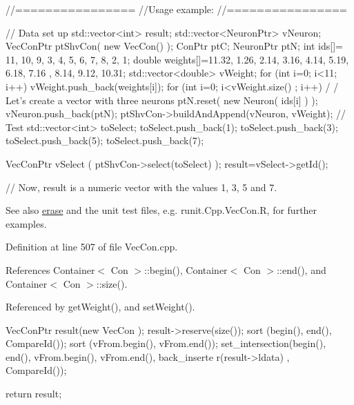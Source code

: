 \begin{DoxyCode}
        //================
        //Usage example:
        //================

        // Data set up
                std::vector<int> result;
                std::vector<NeuronPtr> vNeuron;
                VecConPtr       ptShvCon( new VecCon() );
                ConPtr  ptC;
                NeuronPtr ptN;
                int ids[]= {11, 10, 9, 3, 4, 5, 6, 7, 8, 2, 1};
                double weights[]={11.32, 1.26, 2.14, 3.16, 4.14, 5.19, 6.18, 7.16
      , 8.14, 9.12, 10.31};
                std::vector<double> vWeight;
                for (int i=0; i<11; i++) {
                        vWeight.push_back(weights[i]);
                }
                for (int i=0; i<vWeight.size() ; i++) {                         /
      / Let's create a vector with three neurons
                        ptN.reset( new Neuron( ids[i] ) );
                        vNeuron.push_back(ptN);
                }
                ptShvCon->buildAndAppend(vNeuron, vWeight);
                // Test
                std::vector<int> toSelect;
                toSelect.push_back(1);
                toSelect.push_back(3);
                toSelect.push_back(5);
                toSelect.push_back(7);

                VecConPtr  vSelect (  ptShvCon->select(toSelect)  );
                result=vSelect->getId();

                // Now, result is a numeric vector with the values 1, 3, 5 and 7.
      
\end{DoxyCode}


\begin{DoxySeeAlso}{See also}
\hyperlink{class_vec_con_a4f6a58d420e063b51157e805dfb0b34c}{erase} and the unit test files, e.g. runit.Cpp.VecCon.R, for further examples. 
\end{DoxySeeAlso}


Definition at line 507 of file VecCon.cpp.



References Container$<$ Con $>$::begin(), Container$<$ Con $>$::end(), and Container$<$ Con $>$::size().



Referenced by getWeight(), and setWeight().


\begin{DoxyCode}
                                               {
        VecConPtr result(new VecCon );
        result->reserve(size());
        sort (begin(), end(), CompareId());
        sort (vFrom.begin(), vFrom.end());
        set_intersection(begin(), end(), vFrom.begin(), vFrom.end(), back_inserte
      r(result->ldata) , CompareId());

        return result;
}
\end{DoxyCode}


